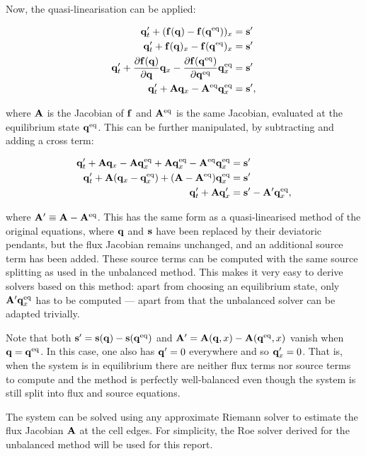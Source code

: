 Now, the quasi-linearisation can be applied:

\begin{align}
  \vb q'_t + (\vb f(\vb q) - \vb f(\vb q^\mathrm{eq}))_x &= \vb s' \label{eq:rogers_discr}\\
  \vb q'_t + \vb f(\vb q)_x - \vb f(\vb q^\mathrm{eq})_x &= \vb s' \\
  \vb q'_t + \pdv{\vb f(\vb q)}{\vb q} \vb q_x - \pdv{\vb f(\vb q^\mathrm{eq})}{\vb q^\mathrm{eq}} \vb q^\mathrm{eq}_x &= \vb s' \\
  \vb q'_t + \vb A \vb q_x - \vb A^\mathrm{eq} \vb q^\mathrm{eq}_x &= \vb s',
\end{align}

where $\vb A$ is the Jacobian of $\vb f$ and $\vb A^\mathrm{eq}$ is the same Jacobian, evaluated at the equilibrium state $\vb q^\mathrm{eq}$. This can be further manipulated, by subtracting and adding a cross term:

\begin{align}
  \vb q'_t + \vb A \vb q_x - \vb A \vb q^\mathrm{eq}_x + \vb A \vb q^\mathrm{eq}_x - \vb A^\mathrm{eq} \vb q^\mathrm{eq}_x &= \vb s' \\
  \vb q'_t + \vb A (\vb q_x - \vb q^\mathrm{eq}_x) + (\vb A  - \vb A^\mathrm{eq}) \vb q^\mathrm{eq}_x &= \vb s' \\
  \vb q'_t + \vb A \vb q'_x &= \vb s' - \vb A' \vb q^\mathrm{eq}_x, \label{eq:rogers_method}
\end{align}

where $\vb A' \equiv \vb A - \vb A^\mathrm{eq}$. This has the same form as a quasi-linearised method of the original equations, where $\vb q$ and $\vb s$ have been replaced by their deviatoric pendants, but the flux Jacobian remains unchanged, and an additional source term has been added. These source terms can be computed with the same source splitting as used in the unbalanced method. This makes it very easy to derive solvers based on this method: apart from choosing an equilibrium state, only $\vb A' \vb q^\mathrm{eq}_x$ has to be computed --- apart from that the unbalanced solver can be adapted trivially.

Note that both $\vb s' = \vb s(\vb q) - \vb s(\vb q^\mathrm{eq})$ and $\vb A' = \vb A(\vb q, x) - \vb A(\vb q^\mathrm{eq}, x)$ vanish when $\vb q = \vb q^\mathrm{eq}$. In this case, one also has $\vb q' = 0$ everywhere and so $\vb q'_x = 0$. That is, when the system is in equilibrium there are neither flux terms nor source terms to compute and the method is perfectly well-balanced even though the system is still split into flux and source equations.

The system can be solved using any approximate Riemann solver to estimate the flux Jacobian $\vb A$ at the cell edges. For simplicity, the Roe solver derived for the unbalanced method will be used for this report.

